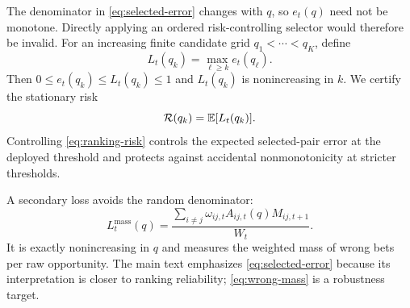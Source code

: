 The denominator in \eqref{eq:selected-error} changes with $q$, so $e_t(q)$ need not be monotone. Directly applying an ordered risk-controlling selector would therefore be invalid. For an increasing finite candidate grid $q_1<\cdots<q_K$, define
\begin{equation}
L_t(q_k)
=
\max_{\ell\geq k}e_t(q_\ell).
\label{eq:monotone-envelope}
\end{equation}
Then $0\leq e_t(q_k)\leq L_t(q_k)\leq1$ and $L_t(q_k)$ is nonincreasing in $k$. We certify the stationary risk
\begin{equation}
\mathcal R(q_k)
=
\mathbb E[L_t(q_k)].
\label{eq:ranking-risk}
\end{equation}
Controlling \eqref{eq:ranking-risk} controls the expected selected-pair error at the deployed threshold and protects against accidental nonmonotonicity at stricter thresholds.

A secondary loss avoids the random denominator:
\begin{equation}
L_t^{\mathrm{mass}}(q)
=
\frac{
\sum_{i\neq j}\omega_{ij,t}A_{ij,t}(q)M_{ij,t+1}
}{W_t}.
\label{eq:wrong-mass}
\end{equation}
It is exactly nonincreasing in $q$ and measures the weighted mass of wrong bets per raw opportunity. The main text emphasizes \eqref{eq:selected-error} because its interpretation is closer to ranking reliability; \eqref{eq:wrong-mass} is a robustness target.
